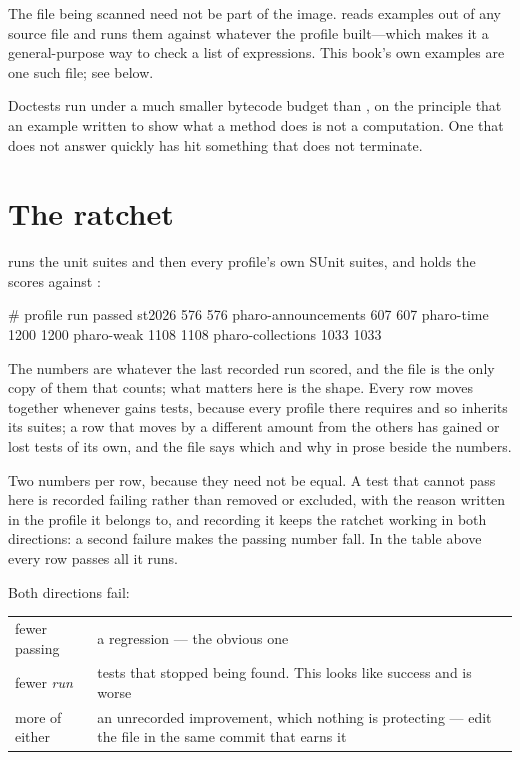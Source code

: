 \begin{stnote}
The file being scanned need not be part of the image.  reads
examples out of any source file and runs them against whatever the profile
built---which makes it a general-purpose way to check a list of expressions.
This book's own examples are one such file; see below.
\end{stnote}

Doctests run under a much smaller bytecode budget than , on the
principle that an example written to show what a method does is not a
computation. One that does not answer quickly has hit something that does not
terminate.

\section{The ratchet}

 runs the unit suites and then every profile's own SUnit suites,
and holds the scores against :

\begin{plain}
# profile               run  passed
st2026                  576  576
pharo-announcements     607  607
pharo-time              1200 1200
pharo-weak              1108 1108
pharo-collections       1033 1033
\end{plain}

The numbers are whatever the last recorded run scored, and the file is the
only copy of them that counts; what matters here is the shape. Every row
moves together whenever  gains tests, because every profile there
requires  and so inherits its suites; a row that moves by a
different amount from the others has gained or lost tests of its own, and
the file says which and why in prose beside the numbers.

Two numbers per row, because they need not be equal. A test that cannot pass
here is recorded failing rather than removed or excluded, with the reason
written in the profile it belongs to, and recording it keeps the ratchet
working in both directions: a second failure makes the passing number fall.
In the table above every row passes all it runs.

Both directions fail:

\begin{center}
\small
\begin{tabular}{@{}lp{}@{}}
\toprule
fewer passing & a regression --- the obvious one\\
fewer \emph{run} & tests that stopped being found. This looks like success and
  is worse\\
more of either & an unrecorded improvement, which nothing is protecting ---
  edit the file in the same commit that earns it\\
\bottomrule
\end{tabular}
\end{center}

